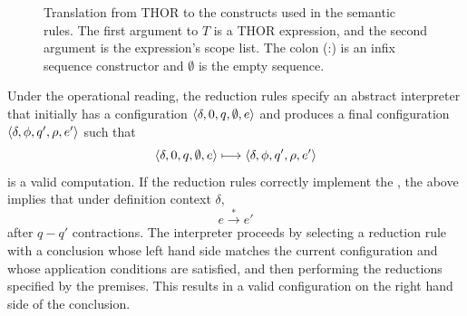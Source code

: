 \begin{figure}[htbp]
\centering
{}
\caption[THOR Translation Rules]{Translation from THOR to the constructs used in the semantic rules.
The first argument to \(T\) is a THOR expression, and the second argument is the
expression's scope list. The colon (:) is an infix sequence constructor and
\(\emptyset\) is the empty sequence.}
\end{figure}

Under the operational reading, the reduction rules specify an abstract
interpreter that initially has a configuration \(\langle \delta,0,q,\emptyset,e\rangle\)
and produces a final configuration \(\langle \delta,\phi,q',\rho,e'\rangle\) such
that
\[
\langle \delta,0,q,\emptyset,e\rangle\longmapsto
\langle \delta,\phi,q',\rho,e'\rangle
\]
is a valid computation. If the reduction rules correctly implement the
\lambdacalculus, the above implies that under definition context \(\delta\),
\[
e\overset{*}{\longrightarrow} e'
\]
after \(q-q'\) contractions. The interpreter proceeds by selecting a reduction
rule with a conclusion whose left hand side matches the current configuration
and whose application conditions are satisfied, and then performing the
reductions specified by the premises. This results in a valid configuration on
the right hand side of the conclusion.

